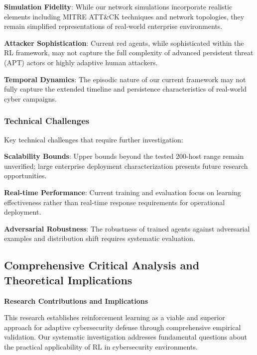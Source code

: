 \documentclass[12pt,oneside]{article}
\begin{document}
\textbf{Simulation Fidelity}: While our network simulations incorporate realistic elements including MITRE ATT\&CK techniques and network topologies, they remain simplified representations of real-world enterprise environments.

\textbf{Attacker Sophistication}: Current red agents, while sophisticated within the RL framework, may not capture the full complexity of advanced persistent threat (APT) actors or highly adaptive human attackers.

\textbf{Temporal Dynamics}: The episodic nature of our current framework may not fully capture the extended timeline and persistence characteristics of real-world cyber campaigns.

\subsubsection{Technical Challenges}
Key technical challenges that require further investigation:

\textbf{Scalability Bounds}: Upper bounds beyond the tested 200-host range remain unverified; large enterprise deployment characterization presents future research opportunities.

\textbf{Real-time Performance}: Current training and evaluation focus on learning effectiveness rather than real-time response requirements for operational deployment.

\textbf{Adversarial Robustness}: The robustness of trained agents against adversarial examples and distribution shift requires systematic evaluation.

\subsection{Comprehensive Critical Analysis and Theoretical Implications}

\textbf{Research Contributions and Implications}

This research establishes reinforcement learning as a viable and superior approach for adaptive cybersecurity defense through comprehensive empirical validation. Our systematic investigation addresses fundamental questions about the practical applicability of RL in cybersecurity environments.
\end{document}
